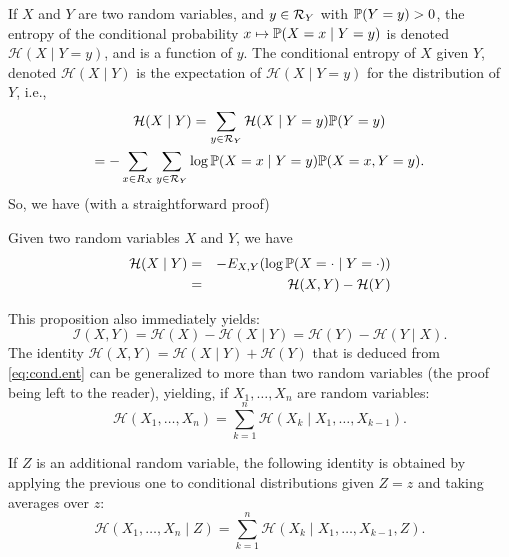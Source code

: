 If $X$ and $Y$ are two random variables, and $y\in {\mathcal R}_Y$
with $\bm{\mathbb P}(Y=y) > 0$,
the entropy of the conditional probability $x \mapsto \bm{\mathbb P}(X=x\mid Y=y)$ is
denoted $\mathcal H(X\mid Y=y)$, and is a function of $y$. The conditional entropy of $X$ given $Y$, denoted $\mathcal H(X\mid Y)$ is the
expectation of $\mathcal H(X\mid Y=y)$ for the distribution of $Y$, i.e.,
\begin{multline*}
\mathcal H(X\mid Y) = \sum_{y\in {\mathcal R}_Y} \mathcal H(X\mid Y=y) \bm{\mathbb P}(Y=y)\\
 = -\sum_{x\in
  R_X} \sum_{y\in {\mathcal R}_Y} \log \bm{\mathbb P}(X=x\mid Y=y)
\bm{\mathbb P}(X=x, Y=y).
\end{multline*}
So, we have (with a straightforward proof)
\begin{proposition}
\label{prop:cond.ent}
Given two random variables $X$ and $Y$, we have
\begin{eqnarray}
\label{eq:cond.ent}
\mathcal H(X\mid Y) &=& -E_{X,Y}(\log \bm{\mathbb P}(X=\cdot \mid Y=\cdot))\\
\nonumber
&=& \mathcal H(X,Y) - \mathcal H(Y)
\end{eqnarray}
\end{proposition}
This proposition also immediately  yields:
\begin{equation}
\label{eq:cond.ind.mut}
\mathcal I(X,Y) = \mathcal H(X) - \mathcal H(X\mid Y) = \mathcal H(Y) - \mathcal H(Y\mid X).
\end{equation}
The identity $\mathcal H(X,Y) = \mathcal H(X\mid Y) + \mathcal H(Y)$ that is deduced from
\cref{eq:cond.ent} can be generalized to more than two random
variables (the proof being left to the reader), yielding, if $X_1,
\ldots, X_n$ are random variables:
\begin{equation}
\label{eq:data.proc.eq}
\mathcal H(X_1, \ldots, X_n) = \sum_{k=1}^n \mathcal H(X_k\mid X_1, \ldots, X_{k-1}).
\end{equation}

If $Z$ is an additional random variable, the following identity is
obtained by applying the previous one to conditional distributions
given $Z=z$ and taking averages over $z$:
\begin{equation}
\label{eq:data.proc.eq.2}
\mathcal H(X_1, \ldots, X_n\mid Z) = \sum_{k=1}^n \mathcal H(X_k\mid X_1, \ldots, X_{k-1}, Z).
\end{equation}\\


